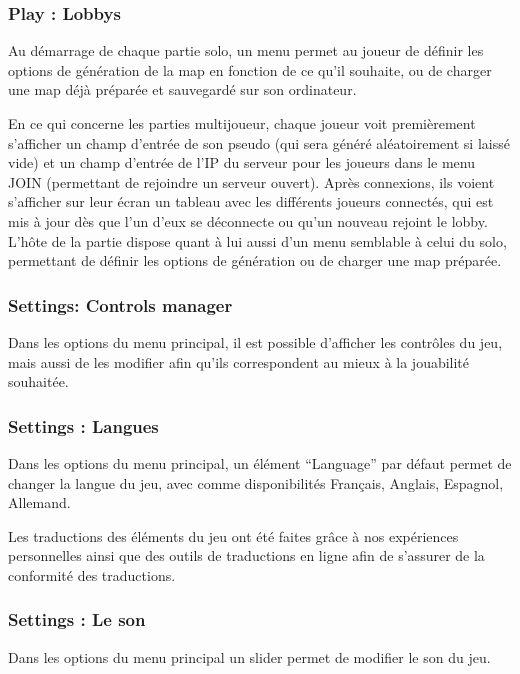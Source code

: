 \documentclass[12pt]{report}
\begin{document}
\subsubsection{Play : Lobbys}

Au démarrage de chaque partie solo, un menu permet au joueur de définir les
options de génération de la map en fonction de ce qu’il souhaite, ou de charger
une map déjà préparée et sauvegardé sur son ordinateur.

En ce qui concerne les parties multijoueur, chaque joueur voit premièrement
s’afficher un champ d’entrée de son pseudo (qui sera généré aléatoirement si
laissé vide) et un champ d’entrée de l’IP du serveur pour les joueurs dans le
menu JOIN (permettant de rejoindre un serveur ouvert). Après connexions, ils
voient s’afficher sur leur écran un tableau avec les différents joueurs
connectés, qui est mis à jour dès que l’un d’eux se déconnecte ou qu’un nouveau
rejoint le lobby. L’hôte de la partie dispose quant à lui aussi d’un menu
semblable à celui du solo, permettant de définir les options de génération ou de
charger une map préparée.

\subsubsection{Settings: Controls manager}

Dans les options du menu principal, il est possible d’afficher les contrôles du
jeu, mais aussi de les modifier afin qu’ils correspondent au mieux à la
jouabilité souhaitée.

\subsubsection{Settings : Langues}

Dans les options du menu principal, un élément “Language” par défaut permet de
changer la langue du jeu, avec comme disponibilités Français, Anglais, Espagnol,
Allemand.

Les traductions des éléments du jeu ont été faites grâce à nos expériences
personnelles ainsi que des outils de traductions en ligne afin de s’assurer de
la conformité des traductions.

\subsubsection{Settings : Le son}

Dans les options du menu principal un slider permet de modifier le son du jeu.
\end{document}
